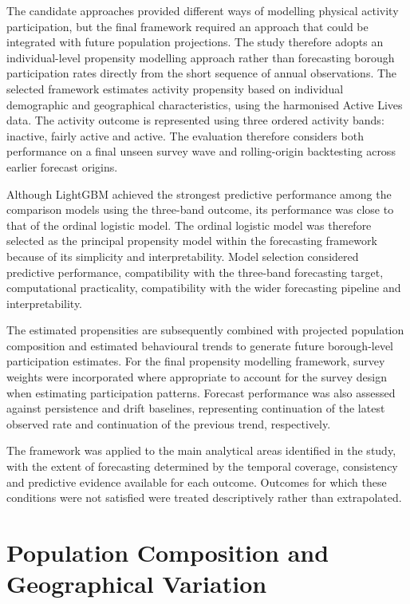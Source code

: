 \documentclass[ %
                    author={Ashrey Ashrey, Sanya Kapoor, Trisha Sharma, Yash Bhooshan Pandloskar},
                supervisor={Dr. Dalila O’Grady},
                    degree={MSc},
                     title={Using machine learning to forecast physical activity participation, volunteering and activity patterns in London},
                  subtitle={},
                      type={},
                      year={2021}]{dissertation}
\begin{document}
The candidate approaches provided different ways of modelling physical activity participation, but the final framework required an approach that could be integrated with future population projections. The study therefore adopts an individual-level propensity modelling approach rather than forecasting borough participation rates directly from the short sequence of annual observations. The selected framework estimates activity propensity based on individual demographic and geographical characteristics, using the harmonised Active Lives data. The activity outcome is represented using three ordered activity bands: inactive, fairly active and active. The evaluation therefore considers both performance on a final unseen survey wave and rolling-origin backtesting across earlier forecast origins.

Although LightGBM achieved the strongest predictive performance among the comparison models using the three-band outcome, its performance was close to that of the ordinal logistic model. The ordinal logistic model was therefore selected as the principal propensity model within the forecasting framework because of its simplicity and interpretability. Model selection considered predictive performance, compatibility with the three-band forecasting target, computational practicality, compatibility with the wider forecasting pipeline and interpretability.

The estimated propensities are subsequently combined with projected population composition and estimated behavioural trends to generate future borough-level participation estimates. For the final propensity modelling framework, survey weights were incorporated where appropriate to account for the survey design when estimating participation patterns. Forecast performance was also assessed against persistence and drift baselines, representing continuation of the latest observed rate and continuation of the previous trend, respectively.

The framework was applied to the main analytical areas identified in the study, with the extent of forecasting determined by the temporal coverage, consistency and predictive evidence available for each outcome. Outcomes for which these conditions were not satisfied were treated descriptively rather than extrapolated.

\section{Population Composition and Geographical Variation}
\end{document}
